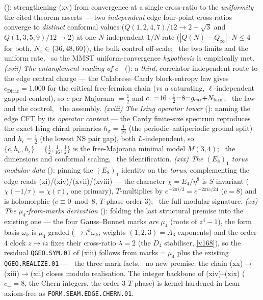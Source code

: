 (): strengthening (xv) from convergence at a single cross-ratio to the
\emph{uniformity} the cited theorem asserts --- two \emph{independent} edge four-point cross-ratios converge to
\emph{distinct} conformal values ($Q(1,2,4,7)/12\to2{+}\sqrt3$ and $Q(1,3,5,9)/12\to2$) at one $N$-independent
$1/N$ rate ($|Q(N){-}Q_\infty|\cdot N\le4$ for both, $N_x\in\{36,48,60\}$), the bulk control off-scale; \mE\ the
two limits and the uniform rate, \mC\ so the MMST uniform-convergence \emph{hypothesis} is empirically met.
\emph{(xvii) The entanglement reading of $c_-$} (): a \emph{third},
correlator-independent route to the edge central charge --- the Calabrese--Cardy block-entropy law gives
$c_{\mathrm{Dirac}}{=}1.000$ for the critical free-fermion chain (vs a saturating, $\ell$-independent gapped
control), so $c$ per Majorana $=\tfrac12$ and $c_-{=}16\cdot\tfrac12{=}8{=}g_{\mathrm{car}}{+}N_{\mathrm{fam}}$; \mE\ the law and the
control, \mC\ the assembly. \emph{(xviii) The Ising operator tower} ():
naming the edge CFT by its \emph{operator content} --- the Cardy finite-size spectrum reproduces the exact Ising
chiral primaries $h_\sigma{=}\tfrac1{16}$ (the periodic--antiperiodic ground split) and $h_\epsilon{=}\tfrac12$ (the
lowest NS pair gap), both $L$-independent, so $\{c,h_\sigma,h_\epsilon\}{=}\{\tfrac12,\tfrac1{16},\tfrac12\}$ is the
free-Majorana minimal model $M(3,4)$; \mE\ the dimensions and conformal scaling, \mC\ the identification.
\emph{(xix) The $(E_8)_1$ torus modular data} (): pinning the $(E_8)_1$ identity on
the \emph{torus}, complementing the edge reads (xi)/(xiv)/(xvii)/(xviii) --- the character $\chi{=}E_4/\eta^8$ is
$S$-invariant ($\chi(-1/\tau){=}\chi(\tau)$, one primary), $T$-multiplies by $e^{-2\pi i/3}{=}e^{-2\pi i c/24}$
($c{=}8$) and is holomorphic ($c\equiv0\bmod8$, $T$-phase order $3$); \mE\ the full modular signature.
\emph{(xx) The $\mu_4$-from-marks derivation} (): folding the last structural
premise into the existing one --- the four Gauss--Bonnet marks \emph{are} $\mu_4$ (roots of $z^4{-}1$), the form
basis $\omega_k$ is $\mu_4$-graded ($\to i^k\omega_k$, weights $(1,2,3){=}A_3$ exponents) and the order-$4$ clock
$z\!\to\!iz$ fixes their cross-ratio $\lambda{=}2$ (the $D_4$ stabiliser, \vref{v168}), so the residual
\texttt{QGEO.SYM.01} of (xiii) follows from marks$=\mu_4$ plus the existing \texttt{QGEO.REALIZE.01} --- \mE\ the
three mark facts, \mC\ no new premise: the chain (xx)$\to$(xiii)$\to$(xii) closes modulo realisation. The integer
backbone of (xiv)--(xix) ($c_-{=}8$, the Chern integers, the order-$3$ $T$-phase) is kernel-hardened in Lean
axiom-free as \texttt{FORM.SEAM.EDGE.CHERN.01}.
